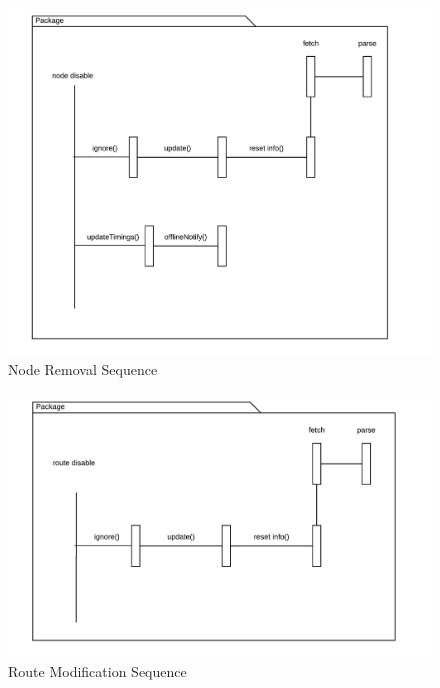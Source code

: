 \documentclass[12pt,a4paper,final]{report}
\begin{document}
	\begin{figure}[!h]
		\begin{center}
			\includegraphics[scale=0.6]{Diagrams/Old Diagrams/Node_Disable_Sequence.jpeg}
		\end{center}
		\caption{Node Removal Sequence}
	\end{figure}
	\begin{figure}[!h]
		\begin{center}
			\includegraphics[scale=0.6]{Diagrams/Old Diagrams/Route_Disable_Sequence.jpeg}
		\end{center}
		\caption{Route Modification Sequence}
	\end{figure}
\end{document}
